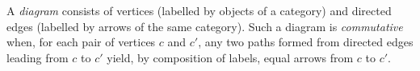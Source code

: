 A \emph{diagram} consists of vertices (labelled by objects of a category) and directed edges (labelled by arrows of the same category). Such a diagram is \emph{commutative} when, for each pair of vertices $c$ and $c'$, any two paths formed from directed edges leading from $c$ to $c'$ yield, by composition of labels, equal arrows from $c$ to $c'$.
